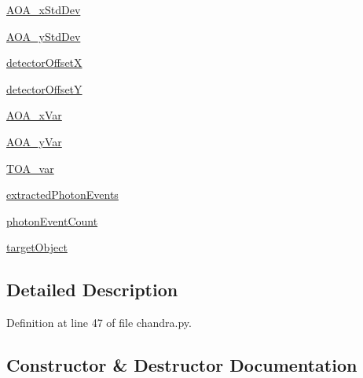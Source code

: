 \begin{DoxyCompactItemize}
\item 
\hyperlink{classmodest_1_1spacecraft_1_1chandra_1_1ChandraDetector_af46def578cb9a03e8ad058198bb3fb00}{A\+O\+A\+\_\+x\+Std\+Dev}
\item 
\hyperlink{classmodest_1_1spacecraft_1_1chandra_1_1ChandraDetector_a63dbcae0376566580e15e90ed6d43d6e}{A\+O\+A\+\_\+y\+Std\+Dev}
\item 
\hyperlink{classmodest_1_1spacecraft_1_1chandra_1_1ChandraDetector_ab9dd653c27aabc7b15feb31b6b939218}{detector\+OffsetX}
\item 
\hyperlink{classmodest_1_1spacecraft_1_1chandra_1_1ChandraDetector_a0ba3efc9bbb500a4e061f1e59d7d9cae}{detector\+OffsetY}
\item 
\hyperlink{classmodest_1_1spacecraft_1_1chandra_1_1ChandraDetector_a5237e5e5aa9610319efc0b0577129152}{A\+O\+A\+\_\+x\+Var}
\item 
\hyperlink{classmodest_1_1spacecraft_1_1chandra_1_1ChandraDetector_af2aec3d08e18e08ad751f76f34bd1807}{A\+O\+A\+\_\+y\+Var}
\item 
\hyperlink{classmodest_1_1spacecraft_1_1chandra_1_1ChandraDetector_a45e346c0f4de1208fd405e8735bb4135}{T\+O\+A\+\_\+var}
\item 
\hyperlink{classmodest_1_1spacecraft_1_1chandra_1_1ChandraDetector_a7ea6a8de562ce6d1a24c31d87c4d70e1}{extracted\+Photon\+Events}
\item 
\hyperlink{classmodest_1_1spacecraft_1_1chandra_1_1ChandraDetector_a3e4c6570287462c64b9aae54c28d1b03}{photon\+Event\+Count}
\item 
\hyperlink{classmodest_1_1spacecraft_1_1chandra_1_1ChandraDetector_ab631efc116ca4b41fb15a81322a7ce47}{target\+Object}
\end{DoxyCompactItemize}


\subsection{Detailed Description}


Definition at line 47 of file chandra.\+py.



\subsection{Constructor \& Destructor Documentation}
